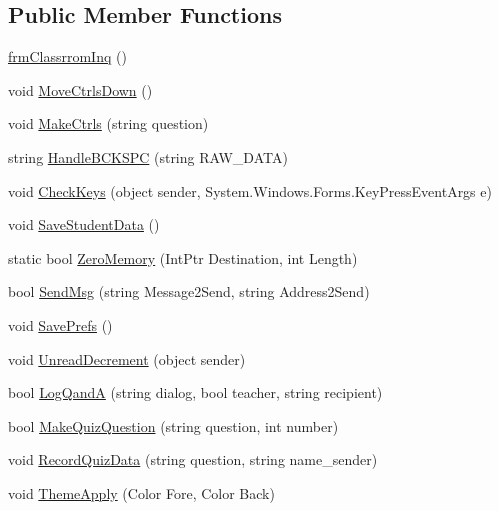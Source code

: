 \subsection*{\-Public \-Member \-Functions}
\begin{DoxyCompactItemize}
\item 
\hyperlink{class_sr_p___classroom_inq_1_1frm_classrrom_inq_ad4c66414acc8ac456211b3f8024ed68c}{frm\-Classrrom\-Inq} ()
\item 
void \hyperlink{class_sr_p___classroom_inq_1_1frm_classrrom_inq_aa37996d682b5f7d39e5e53d8edd658ab}{\-Move\-Ctrls\-Down} ()
\item 
void \hyperlink{class_sr_p___classroom_inq_1_1frm_classrrom_inq_a8ae3b3804b16d4c67b8ff652eb5488ed}{\-Make\-Ctrls} (string question)
\item 
string \hyperlink{class_sr_p___classroom_inq_1_1frm_classrrom_inq_aecc5d7b6ce2373bb863ce0eefa481783}{\-Handle\-B\-C\-K\-S\-P\-C} (string \-R\-A\-W\-\_\-\-D\-A\-T\-A)
\item 
void \hyperlink{class_sr_p___classroom_inq_1_1frm_classrrom_inq_a5703a99c40db13bca956c2204fbb1205}{\-Check\-Keys} (object sender, \-System.\-Windows.\-Forms.\-Key\-Press\-Event\-Args e)
\item 
void \hyperlink{class_sr_p___classroom_inq_1_1frm_classrrom_inq_a592fd224417dbd9b7031128315cf0f45}{\-Save\-Student\-Data} ()
\item 
static bool \hyperlink{class_sr_p___classroom_inq_1_1frm_classrrom_inq_a9e1b1e677182d3bb85b5f2bbc80d60fb}{\-Zero\-Memory} (\-Int\-Ptr \-Destination, int \-Length)
\item 
bool \hyperlink{class_sr_p___classroom_inq_1_1frm_classrrom_inq_a525504ef91d8a99202dbcbc825a7aac2}{\-Send\-Msg} (string \-Message2\-Send, string \-Address2\-Send)
\item 
void \hyperlink{class_sr_p___classroom_inq_1_1frm_classrrom_inq_aabba19a4aa4afa3cfe15cace40e76130}{\-Save\-Prefs} ()
\item 
void \hyperlink{class_sr_p___classroom_inq_1_1frm_classrrom_inq_ad0d8d87caafd97e9a48736804a88587c}{\-Unread\-Decrement} (object sender)
\item 
bool \hyperlink{class_sr_p___classroom_inq_1_1frm_classrrom_inq_a3013595b3a4e7bb6d8c8871d788aad44}{\-Log\-Qand\-A} (string dialog, bool teacher, string recipient)
\item 
bool \hyperlink{class_sr_p___classroom_inq_1_1frm_classrrom_inq_af53e6dc60cbe667e6b83a7591ee7678f}{\-Make\-Quiz\-Question} (string question, int number)
\item 
void \hyperlink{class_sr_p___classroom_inq_1_1frm_classrrom_inq_a3571b56a7d0a64193e695447f01f6aa3}{\-Record\-Quiz\-Data} (string question, string name\-\_\-sender)
\item 
void \hyperlink{class_sr_p___classroom_inq_1_1frm_classrrom_inq_a49a01531baae47d6f0c5d58265f362b8}{\-Theme\-Apply} (\-Color \-Fore, \-Color \-Back)
\end{DoxyCompactItemize}
